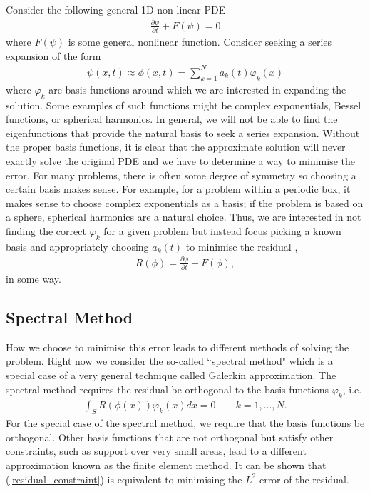 Consider the following general 1D non-linear PDE
\begin{align}
\frac{\partial \psi}{\partial t} + F(\psi) = 0
\end{align}
where $F(\psi)$ is some general nonlinear function. Consider seeking a series expansion of the form \cite{durran}
\begin{align}
\psi(x,t)\approx \phi(x,t) = \sum_{k=1}^{N}a_{k}(t)\varphi_{k}(x)
\end{align}
where $\varphi_{k}$ are basis functions around which we are interested in expanding the solution. Some examples of such functions might be complex exponentials, Bessel functions, or spherical harmonics. In general,  we will not be able to find the eigenfunctions that provide the natural basis to seek a series expansion. Without the proper basis functions, it is clear that the approximate solution will never exactly solve the original PDE and we have to determine a way to minimise the error. For many problems, there is often some degree of symmetry so choosing a certain basis makes sense. For example, for a problem within a periodic box, it makes sense to choose complex exponentials as a basis; if the problem is based on a sphere, spherical harmonics are a natural choice. Thus, we are interested in not finding the correct $\varphi_{k}$ for a given problem but instead focus picking a known basis and appropriately choosing $a_{k}(t)$ to minimise the residual \cite{durran},
\begin{align}
R(\phi) = \frac{\partial \phi}{\partial t} + F(\phi),
\end{align}
in some way.  

\subsection{Spectral Method}
How we choose to minimise this error leads to different methods of solving the problem. Right now we consider the so-called ``spectral method" which is a special case of a very general technique called Galerkin approximation.  The spectral method requires the residual be orthogonal to the basis functions $\varphi_{k}$, i.e.
\begin{align}
\int_{S}R(\phi(x))\varphi_{k}(x)dx = 0 \qquad k=1,\ldots,N.\label{residual_constraint}
\end{align}
For the special case of the spectral method, we require that the basis functions be orthogonal. Other basis functions that are not orthogonal but satisfy other constraints, such as support over very small areas, lead to a different approximation known as the finite element method\cite{durran}. It can be shown \cite{durran} that (\ref{residual_constraint}) is equivalent to minimising the $L^{2}$ error of the residual. 

